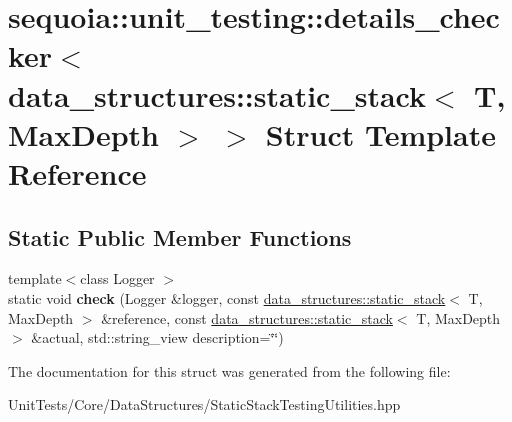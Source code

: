 \hypertarget{structsequoia_1_1unit__testing_1_1details__checker_3_01data__structures_1_1static__stack_3_01_t_00_01_max_depth_01_4_01_4}{}\section{sequoia\+::unit\+\_\+testing\+::details\+\_\+checker$<$ data\+\_\+structures\+::static\+\_\+stack$<$ T, Max\+Depth $>$ $>$ Struct Template Reference}
\label{structsequoia_1_1unit__testing_1_1details__checker_3_01data__structures_1_1static__stack_3_01_t_00_01_max_depth_01_4_01_4}
\subsection*{Static Public Member Functions}
\begin{DoxyCompactItemize}
\item 
\mbox{\label{structsequoia_1_1unit__testing_1_1details__checker_3_01data__structures_1_1static__stack_3_01_t_00_01_max_depth_01_4_01_4_abd2a4ddc2ff232ff30d4dfe1f5b74cab}} 
{\footnotesize template$<$class Logger $>$ }\\static void {\bfseries check} (Logger \&logger, const \mbox{\hyperlink{classsequoia_1_1data__structures_1_1static__stack}{data\+\_\+structures\+::static\+\_\+stack}}$<$ T, Max\+Depth $>$ \&reference, const \mbox{\hyperlink{classsequoia_1_1data__structures_1_1static__stack}{data\+\_\+structures\+::static\+\_\+stack}}$<$ T, Max\+Depth $>$ \&actual, std\+::string\+\_\+view description=\char`\"{}\char`\"{})
\end{DoxyCompactItemize}


The documentation for this struct was generated from the following file\+:\begin{DoxyCompactItemize}
\item 
Unit\+Tests/\+Core/\+Data\+Structures/Static\+Stack\+Testing\+Utilities.\+hpp\end{DoxyCompactItemize}
